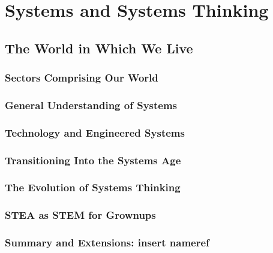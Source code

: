\documentclass[11pt,fleqn]{book} %
\begin{document}
\newcommand{\subtitle}{Doctor Wolter J Fabrycky}






\part{Systems and Systems Thinking}

  \chapter{The World in Which We Live}
    \section{Sectors Comprising Our World}
      \label{sec:sectors-comprising-our}
    \section{General Understanding of Systems}
    \section{Technology and Engineered Systems}
    \section{Transitioning Into the Systems Age}
    \section{The Evolution of Systems Thinking}
    \section{STEA as STEM for Grownups}
    \section{Summary and Extensions: insert nameref}	%
\end{document}
